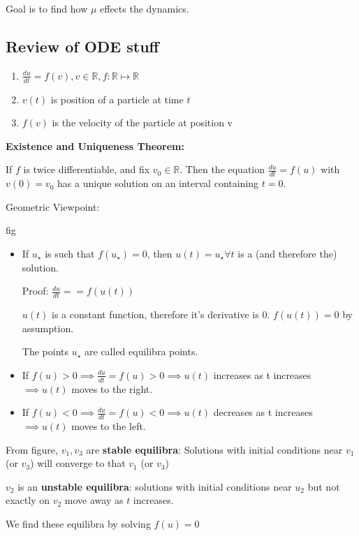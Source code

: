 \documentclass[main.tex]{subfiles}
\begin{document}
Goal is to find how $\mu$ effects the dynamics.

\subsection{Review of ODE stuff}

\begin{enumerate}
    \item $\frac{du}{dt} = f(v), v\in\mathbb{R}, f: \mathbb{R} \mapsto \mathbb{R}$

    \item $v(t)$ is position of a particle at time $t$

    \item $f(v)$ is the velocity of the particle at position v
\end{enumerate}

\textbf{Existence and Uniqueness Theorem:}

If $f$ is twice differentiable, and fix $v_0\in\mathbb{R}$. Then the equation $\frac{du}{dt}=f(u)$ with $v(0) = v_0$ has a unique solution on an interval containing $t=0$.

Geometric Viewpoint:

fig
\begin{itemize}

\item If $u_\star$ is such that $f(u_\star)=0$, then $u(t)=u_\star\forall t$ is a (and therefore the) solution.

Proof: $\frac{du}{dt} == f(u(t))$

$u(t)$ is a constant function, therefore it's derivative is 0. $f(u(t)) = 0$ by assumption.

The points $u_\star$ are called equilibra points.

\item If $f(u) > 0 \implies \frac{du}{dt} = f(u) > 0 \implies u(t)$ increases as t increases $\implies u(t)$ moves to the right.

\item If $f(u) < 0 \implies \frac{du}{dt} = f(u) < 0 \implies u(t)$ decreases as t increases $\implies u(t)$ moves to the left.

\end{itemize}

From figure, $v_1, v_3$ are \textbf{stable equilibra}: Solutions with initial conditions near $v_1$ (or $v_3$) will converge to that $v_1$ (or $v_3$)

$v_2$ is an \textbf{unstable equilibra}: solutions with initial conditions near $u_2$ but not exactly on $v_2$ move away as $t$ increases.

We find these equilibra by solving $f(u) = 0$
\end{document}
